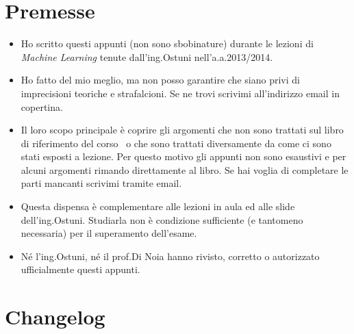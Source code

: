 \section*{Premesse}
\begin{itemize}
\item Ho scritto questi appunti (non sono sbobinature) durante le lezioni di \emph{Machine Learning }tenute dall'ing.\@ Ostuni nell'a.a.\@ 2013/2014. 

\item Ho fatto del mio meglio, ma non posso garantire che siano privi di imprecisioni teoriche e strafalcioni. Se ne trovi scrivimi all'indirizzo email in copertina.

\item Il loro scopo principale è coprire gli argomenti che non sono trattati sul libro di riferimento del corso~\cite{AIMA} o che sono trattati diversamente da come ci sono stati esposti a lezione. Per questo motivo gli appunti non sono esaustivi e per alcuni argomenti rimando direttamente al libro. Se hai voglia di completare le parti mancanti scrivimi tramite email.

\item Questa dispensa è complementare alle lezioni in aula ed alle slide dell'ing.\@  Ostuni. Studiarla non è condizione sufficiente (e tantomeno necessaria) per il superamento dell'esame.

\item Né l'ing.\@  Ostuni, né il prof.\@  Di Noia hanno rivisto, corretto o autorizzato ufficialmente questi appunti.
\end{itemize}

\section*{Changelog}

